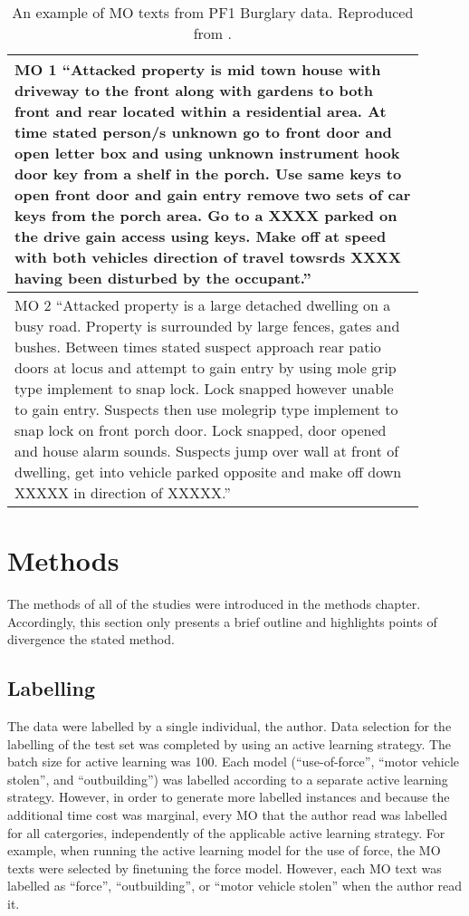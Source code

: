 \begin{table}[]
\begin{tabular}{p{0.9\linewidth}}
\toprule
MO 1 “Attacked property is mid town house with driveway to the front along with gardens to both front and rear located within a residential area. At time stated person/s unknown go to front door and open letter box and using unknown instrument hook door key from a shelf in the porch. Use same keys to open front door and gain entry remove two sets of car keys from the porch area. Go to a XXXX parked on the drive gain access using keys. Make off at speed with both vehicles direction of travel towsrds XXXX having been disturbed by the occupant.”             \\ \midrule
MO 2 “Attacked property is a large detached dwelling on a busy road. Property is surrounded by large fences, gates and bushes. Between times stated suspect approach rear patio doors at locus and attempt to gain entry by using mole grip type implement to snap lock. Lock snapped however unable to gain entry. Suspects then use molegrip type implement to snap lock on front porch door. Lock snapped, door opened and house alarm sounds. Suspects jump over wall at front of dwelling, get into vehicle parked opposite and make off down XXXXX in direction of XXXXX.” \\ \bottomrule
\end{tabular}
\caption[Example MO texts]{\label{tab:MOexample} An example of MO texts from PF1 Burglary data. Reproduced from \textcite{birks2020unsupervised}.}
\end{table}


\section{Methods} The methods of all of the studies were introduced in the methods chapter. Accordingly, this section only presents a brief outline and highlights points of divergence the stated method. 

\subsection{Labelling} The data were labelled by a single individual, the author. Data selection for the labelling of the test set was completed by using an active learning strategy. The batch size for active learning was 100. Each model  (“use-of-force”, “motor vehicle stolen”, and “outbuilding”) was labelled according to a separate active learning strategy. However, in order to generate more labelled instances and because the additional time cost was marginal, every MO that the author read was labelled for all catergories, independently of the applicable active learning strategy. For example, when running the active learning model for the use of force, the MO texts were selected by finetuning the force model. However, each MO text was labelled as “force”, “outbuilding”, or “motor vehicle stolen” when the author read it.

